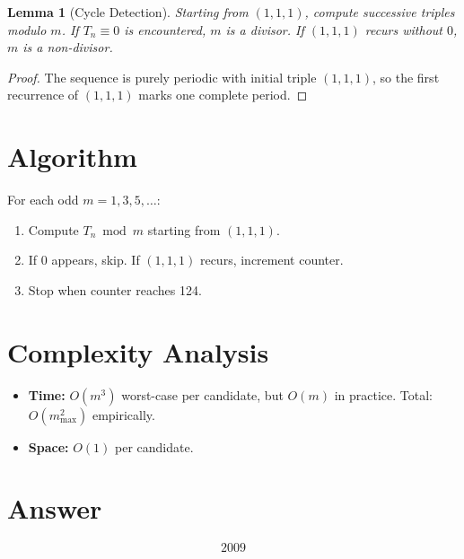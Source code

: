 \documentclass[12pt]{article}
\newtheorem{lemma}[theorem]{Lemma}
\begin{document}
\begin{lemma}[Cycle Detection]
Starting from $(1,1,1)$, compute successive triples modulo $m$. If $T_n \equiv 0$ is encountered, $m$ is a divisor. If $(1,1,1)$ recurs without $0$, $m$ is a non-divisor.
\end{lemma}
\begin{proof}
The sequence is purely periodic with initial triple $(1,1,1)$, so the first recurrence of $(1,1,1)$ marks one complete period.
\end{proof}

\section{Algorithm}
For each odd $m = 1, 3, 5, \ldots$:
\begin{enumerate}
\item Compute $T_n \bmod m$ starting from $(1,1,1)$.
\item If $0$ appears, skip. If $(1,1,1)$ recurs, increment counter.
\item Stop when counter reaches 124.
\end{enumerate}

\section{Complexity Analysis}
\begin{itemize}
\item \textbf{Time:} $O(m^3)$ worst-case per candidate, but $O(m)$ in practice. Total: $O(m_{\max}^2)$ empirically.
\item \textbf{Space:} $O(1)$ per candidate.
\end{itemize}

\section{Answer}

\[
\boxed{2009}
\]
\end{document}
